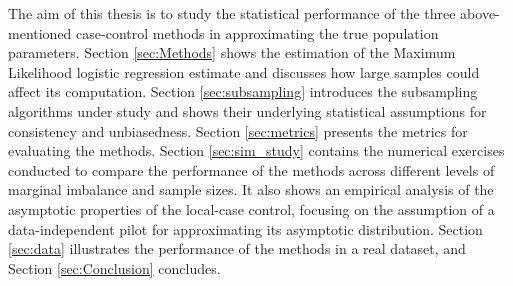 The aim of this thesis is to study the statistical performance of the three above-mentioned case-control methods in approximating the true population parameters. Section \ref{sec:Methods} shows the estimation of the Maximum Likelihood logistic regression estimate and discusses how large samples could affect its computation. Section \ref{sec:subsampling} introduces the subsampling algorithms under study and shows their underlying statistical assumptions for consistency and unbiasedness. Section \ref{sec:metrics} presents the metrics for evaluating the methods. Section \ref{sec:sim_study} contains the numerical exercises conducted to compare the performance of the methods across different levels of marginal imbalance and sample sizes. It also shows an empirical analysis of the asymptotic properties of the local-case control, focusing on the assumption of a data-independent pilot for approximating its asymptotic distribution. Section \ref{sec:data} illustrates the performance of the methods in a real dataset, and Section \ref{sec:Conclusion} concludes.

